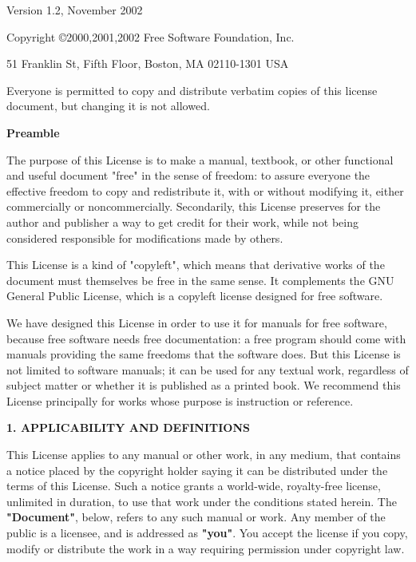\documentclass[a4paper,12pt]{book}
\begin{document}
 \begin{center}

       Version 1.2, November 2002


 Copyright \copyright 2000,2001,2002  Free Software Foundation, Inc.

 \bigskip

     51 Franklin St, Fifth Floor, Boston, MA  02110-1301  USA

 \bigskip

 Everyone is permitted to copy and distribute verbatim copies
 of this license document, but changing it is not allowed.
\end{center}


\begin{center}
{\bf\large Preamble}
\end{center}

The purpose of this License is to make a manual, textbook, or other
functional and useful document "free" in the sense of freedom: to
assure everyone the effective freedom to copy and redistribute it,
with or without modifying it, either commercially or noncommercially.
Secondarily, this License preserves for the author and publisher a way
to get credit for their work, while not being considered responsible
for modifications made by others.

This License is a kind of "copyleft", which means that derivative
works of the document must themselves be free in the same sense.  It
complements the GNU General Public License, which is a copyleft
license designed for free software.

We have designed this License in order to use it for manuals for free
software, because free software needs free documentation: a free
program should come with manuals providing the same freedoms that the
software does.  But this License is not limited to software manuals;
it can be used for any textual work, regardless of subject matter or
whether it is published as a printed book.  We recommend this License
principally for works whose purpose is instruction or reference.


\begin{center}
{\Large\bf 1. APPLICABILITY AND DEFINITIONS}
\end{center}

This License applies to any manual or other work, in any medium, that
contains a notice placed by the copyright holder saying it can be
distributed under the terms of this License.  Such a notice grants a
world-wide, royalty-free license, unlimited in duration, to use that
work under the conditions stated herein.  The \textbf{"Document"}, below,
refers to any such manual or work.  Any member of the public is a
licensee, and is addressed as \textbf{"you"}.  You accept the license if you
copy, modify or distribute the work in a way requiring permission
under copyright law.
\end{document}
